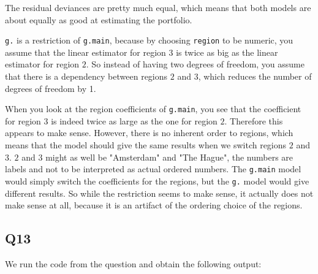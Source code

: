 \documentclass[11pt]{article}
\begin{document}
The residual deviances are pretty much equal, which means that both models are about equally as good at estimating the portfolio.

\verb|g.| is a restriction of \verb|g.main|, because by choosing \verb|region| to be numeric, you assume that the linear estimator for region $3$ is twice as big as the linear estimator for region $2$. So instead of having two degrees of freedom, you assume that there is a dependency between regions $2$ and $3$, which reduces the number of degrees of freedom by 1.

When you look at the region coefficients of \verb|g.main|, you see that the coefficient for region $3$ is indeed twice as large as the one for region $2$. Therefore this appears to make sense. However, there is no inherent order to regions, which means that the model should give the same results when we switch regions $2$ and $3$. $2$ and $3$ might as well be "Amsterdam" and "The Hague", the numbers are labels and not to be interpreted as actual ordered numbers. The \verb|g.main| model would simply switch the coefficients for the regions, but the \verb|g.| model would give different results. So while the restriction seems to make sense, it actually does not make sense at all, because it is an artifact of the ordering choice of the regions.


\subsection*{Q13}
We run the code from the question and obtain the following output:
\end{document}
